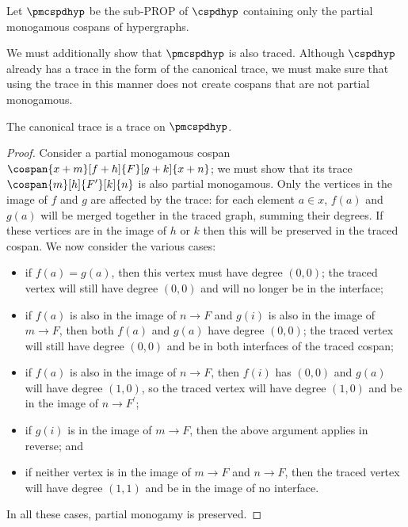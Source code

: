 \begin{definition}
    Let \(\pmcspdhyp\) be the sub-PROP of \(\cspdhyp\) containing only the
    partial monogamous cospans of hypergraphs.
\end{definition}

We must additionally show that \(\pmcspdhyp\) is also traced.
Although \(\cspdhyp\) already has a trace in the form of the canonical trace, we
must make sure that using the trace in this manner does not create cospans that
are not partial monogamous.

\begin{theorem}\label{thm:partial-monogamous-trace}
    The canonical trace is a trace on \(\pmcspdhyp\).
\end{theorem}
\begin{proof}
    Consider a partial monogamous cospan \(
    \cospan{x + m}[f + h]{F}[g + k]{x + n}
    \); we must show that its trace \(
    \cospan{m}[h]{F^\prime}[k]{n}
    \) is also partial monogamous.
    Only the vertices in the image of \(f\) and \(g\) are affected by the trace:
    for each element \(a \in x\), \(f(a)\) and \(g(a)\) will be merged
    together in the traced graph, summing their degrees.
    If these vertices are in the image of \(h\) or \(k\) then this will be
    preserved in the traced cospan.
    We now consider the various cases:
    \begin{itemize}
        \item if \(f(a) = g(a)\), then this vertex must have degree \((0, 0)\);
              the traced vertex will still have degree \((0, 0)\) and will no
              longer be in the interface;
        \item if \(f(a)\) is also in the image of \(n \to F\) and \(g(i)\) is
              also in the image of \(m \to F\), then both \(f(a)\) and
              \(g(a)\) have degree \((0, 0)\); the traced vertex will still
              have degree \((0, 0)\) and be in both interfaces of the traced
              cospan;
        \item if \(f(a)\) is also in the image of \(n \to F\), then \(f(i)\)
              has \((0, 0)\) and \(g(a)\) will have degree
              \((1,0)\), so the traced vertex will have degree \((1, 0)\) and
              be in the image of \(n \to F^\prime\);
        \item if \(g(i)\) is in the image of \(m \to F\), then the above
              argument applies in reverse; and
        \item if neither vertex is in the image of \(m \to F\) and \(n \to F\),
              then the traced vertex will have degree \((1,1)\) and be in the
              image of no interface.
    \end{itemize}
    In all these cases, partial monogamy is preserved.
\end{proof}

